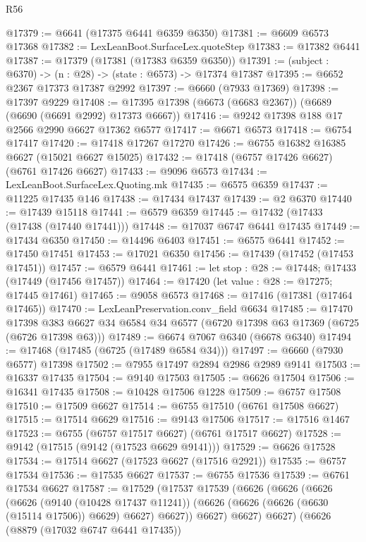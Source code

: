 \begin{lexlean}{R56}
\begin{coremodule}
@17379 := @6641 (@17375 @6441 @6359 @6350)
@17381 := @6609 @6573 @17368
@17382 := LexLeanBoot.SurfaceLex.quoteStep
@17383 := @17382 @6441
@17387 := @17379 (@17381 (@17383 @6359 @6350))
@17391 := (subject : @6370) -> (n : @28) -> (state : @6573) -> @17374 @17387
@17395 := @6652 @2367 @17373 @17387 @2992
@17397 := @6660 (@7933 @17369)
@17398 := @17397 @9229
@17408 := @17395 @17398 (@6673 (@6683 @2367)) (@6689 (@6690 (@6691 @2992) @17373 @6667))
@17416 := @9242 @17398 @188 @17 @2566 @2990 @6627 @17362 @6577
@17417 := @6671 @6573
@17418 := @6754 @17417
@17420 := @17418 @17267 @17270
@17426 := @6755 @16382 @16385 @6627 (@15021 @6627 @15025)
@17432 := @17418 (@6757 @17426 @6627) (@6761 @17426 @6627)
@17433 := @9096 @6573
@17434 := LexLeanBoot.SurfaceLex.Quoting.mk
@17435 := @6575 @6359
@17437 := @11225 @17435 @146
@17438 := @17434 @17437
@17439 := @2 @6370
@17440 := @17439 @15118
@17441 := @6579 @6359
@17445 := @17432 (@17433 (@17438 (@17440 @17441)))
@17448 := @17037 @6747 @6441 @17435
@17449 := @17434 @6350
@17450 := @14496 @6403
@17451 := @6575 @6441
@17452 := @17450 @17451
@17453 := @17021 @6350
@17456 := @17439 (@17452 (@17453 @17451))
@17457 := @6579 @6441
@17461 := let stop : @28 := @17448; @17433 (@17449 (@17456 @17457))
@17464 := @17420 (let value : @28 := @17275; @17445 @17461)
@17465 := @9058 @6573
@17468 := @17416 (@17381 (@17464 @17465))
@17470 := LexLeanPreservation.conv_field @6634
@17485 := @17470
    @17398
    @383
    @6627
    @34
    @6584
    @34
    @6577
    (@6720 @17398 @63 @17369 (@6725 (@6726 @17398 @63)))
@17489 := @6674 @7067 @6340 (@6678 @6340)
@17494 := @17468 (@17485 (@6725 (@17489 @6584 @34)))
@17497 := @6660 (@7930 @6577) @17398
@17502 := @7955 @17497 @2894 @2986 @2989 @9141
@17503 := @16337 @17435
@17504 := @9140 @17503
@17505 := @6626 @17504
@17506 := @16341 @17435
@17508 := @10428 @17506 @1228
@17509 := @6757 @17508
@17510 := @17509 @6627
@17514 := @6755 @17510 (@6761 @17508 @6627)
@17515 := @17514 @6629
@17516 := @9143 @17506
@17517 := @17516 @1467
@17523 := @6755 (@6757 @17517 @6627) (@6761 @17517 @6627)
@17528 := @9142 (@17515 (@9142 (@17523 @6629 @9141)))
@17529 := @6626 @17528
@17534 := @17514 @6627 (@17523 @6627 (@17516 @2921))
@17535 := @6757 @17534
@17536 := @17535 @6627
@17537 := @6755 @17536
@17539 := @6761 @17534 @6627
@17587 := @17529
    (@17537
      @17539
      (@6626
        (@6626
          (@6626
            (@6626
              (@9140 (@10428 @17437 @11241))
              (@6626 (@6626 (@6626 (@6630 (@15114 @17506)) @6629) @6627) @6627))
            @6627)
          @6627)
        @6627)
      (@6626
        (@8879 (@17032 @6747 @6441 @17435))

\end{coremodule}
\end{lexlean}
